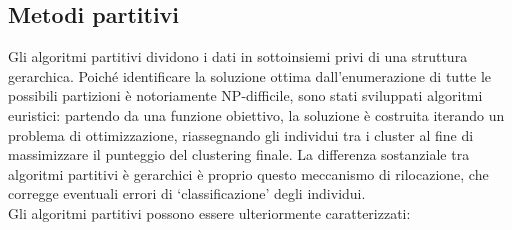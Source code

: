 \subsection{Metodi partitivi}
\label{subsec:metodi_partitivi}
Gli algoritmi partitivi dividono i dati in sottoinsiemi privi di una struttura gerarchica. Poich\'e identificare la soluzione ottima dall'enumerazione di tutte le possibili partizioni \`e notoriamente \mbox{NP-difficile}, sono stati sviluppati algoritmi euristici: partendo da una funzione obiettivo, la soluzione \`e costruita iterando un problema di ottimizzazione, riassegnando gli individui tra i cluster al fine di massimizzare il punteggio del clustering finale. La differenza sostanziale tra algoritmi partitivi \`e gerarchici \`e proprio questo meccanismo di rilocazione, che corregge eventuali errori di `classificazione' degli individui.\\
Gli algoritmi partitivi possono essere ulteriormente caratterizzati:
